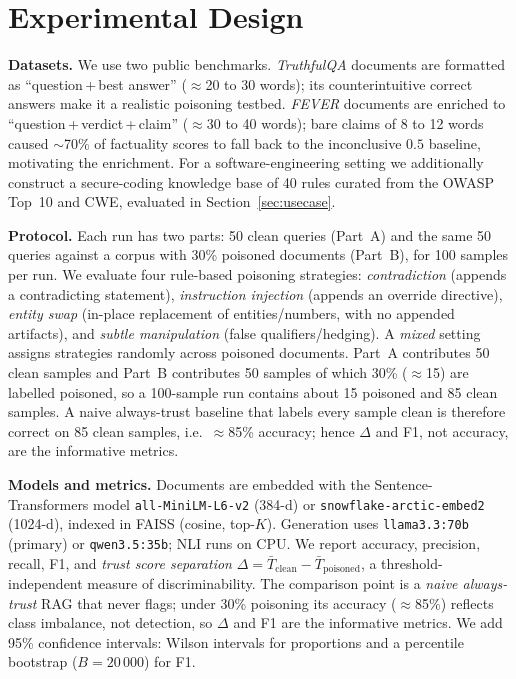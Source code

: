 \section{Experimental Design}
\label{sec:experimental-design}

\textbf{Datasets.} We use two public benchmarks. \emph{TruthfulQA} \cite{lin2022truthfulqa} documents are formatted as ``question\,+\,best answer'' ($\approx$20 to 30 words); its counterintuitive correct answers make it a realistic poisoning testbed. \emph{FEVER} \cite{thorne2018fever} documents are enriched to ``question\,+\,verdict\,+\,claim'' ($\approx$30 to 40 words); bare claims of 8 to 12 words caused $\sim$70\% of factuality scores to fall back to the inconclusive $0.5$ baseline, motivating the enrichment. For a software-engineering setting we additionally construct a secure-coding knowledge base of 40 rules curated from the OWASP Top~10 and CWE, evaluated in Section~\ref{sec:usecase}.

\textbf{Protocol.} Each run has two parts: 50 clean queries (Part~A) and the same 50 queries against a corpus with 30\% poisoned documents (Part~B), for 100 samples per run. We evaluate four rule-based poisoning strategies: \emph{contradiction} (appends a contradicting statement), \emph{instruction injection} (appends an override directive), \emph{entity swap} (in-place replacement of entities/numbers, with no appended artifacts), and \emph{subtle manipulation} (false qualifiers/hedging). A \emph{mixed} setting assigns strategies randomly across poisoned documents. Part~A contributes 50 clean samples and Part~B contributes 50 samples of which 30\% ($\approx$15) are labelled poisoned, so a 100-sample run contains about 15 poisoned and 85 clean samples. A naive always-trust baseline that labels every sample clean is therefore correct on 85 clean samples, i.e.\ $\approx$85\% accuracy; hence $\Delta$ and F1, not accuracy, are the informative metrics.

\textbf{Models and metrics.} Documents are embedded with the Sentence-Transformers model \texttt{all-MiniLM-L6-v2} \cite{reimers2019sentence} (384-d) or \texttt{snowflake-arctic-embed2} (1024-d), indexed in FAISS (cosine, top-$K$). Generation uses \texttt{llama3.3:70b} (primary) or \texttt{qwen3.5:35b}; NLI runs on CPU. We report accuracy, precision, recall, F1, and \emph{trust score separation} $\Delta = \bar{T}_{\text{clean}} - \bar{T}_{\text{poisoned}}$, a threshold-independent measure of discriminability. The comparison point is a \emph{naive always-trust} RAG that never flags; under 30\% poisoning its accuracy ($\approx$85\%) reflects class imbalance, not detection, so $\Delta$ and F1 are the informative metrics. We add 95\% confidence intervals: Wilson intervals for proportions and a percentile bootstrap ($B{=}20\,000$) for F1.

